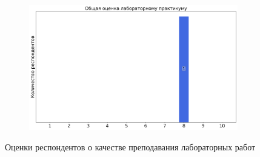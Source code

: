 \begin{figure}[H]
\begin{subfigure}[b]{0.45\textwidth}
			\end{subfigure}
			\begin{subfigure}[b]{0.45\textwidth}
				\centering
				\includegraphics[width=\textwidth]{images/3 course/Аналоговая электроника/labniks-marks-Гутор А.В.-3.png}
			\end{subfigure}	
			\caption{Оценки респондентов о качестве преподавания лабораторных работ}
		\end{figure}

        
